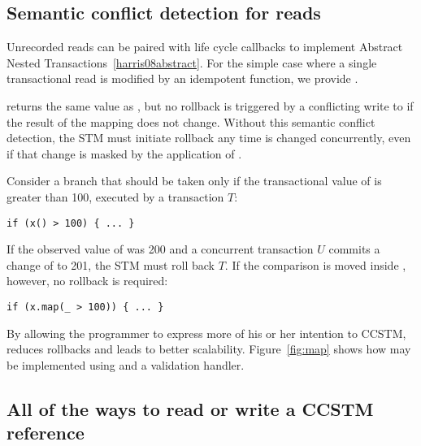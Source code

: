 \subsection{Semantic conflict detection for reads}
\label{sec:map}

Unrecorded reads can be paired with life cycle callbacks to implement
Abstract Nested Transactions~\ref{harris08abstract}.  For the simple case where
a single transactional read is modified by an idempotent function, we provide
\code{map[}\code{](f: }\code{ => }\code{): }.

 returns the same value as , but no rollback
is triggered by a conflicting write to  if the result of the mapping
does not change.  Without this
semantic conflict detection, the STM must initiate rollback any time 
is changed concurrently, even if that change is masked by the application of
.

Consider a branch that should be taken only if the transactional value of
 is greater than 100, executed by a transaction $T$:
\lstset{numbers=none}
\begin{lstlisting}
if (x() > 100) { ... }
\end{lstlisting}
\lstset{numbers=left}
If the observed value of  was 200 and a concurrent transaction $U$ commits
a change of  to 201, the STM must roll back $T$.  If the comparison is
moved inside , however, no rollback is required:
\lstset{numbers=none}
\begin{lstlisting}
if (x.map(_ > 100)) { ... }
\end{lstlisting}
\lstset{numbers=left}
By allowing the programmer to express more of his or her intention to CCSTM,
 reduces rollbacks and leads to better scalability.
Figure~\ref{fig:map} shows how  may be implemented using
 and a validation handler.



\subsection{All of the ways to read or write a CCSTM reference}

